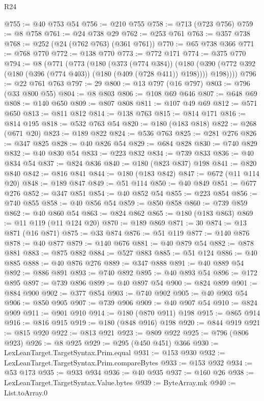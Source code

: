 \begin{lexlean}{R24}
\begin{coremodule}
@755 := @40 @753 @54
@756 := @210 @755
@758 := @713 (@723 @756)
@759 := @8 @758
@761 := @24 @738 @29
@762 := @253 @761
@763 := @357 @738
@768 := @252 (@24 (@762 @763) (@361 @761))
@770 := @65 @738 @366
@771 := @768 @770
@772 := @138 @770
@773 := @772 @171
@774 := @375 @770
@794 := @8
    (@771
      (@773
        (@180
          (@373 (@774 @384))
          (@180 (@390 (@772 @392 (@180 (@396 (@774 @403)) (@180 (@409 (@728 @411)) @198)))) @198))))
@796 := @22 @761 @763
@797 := 29
@800 := @13 @797 (@16 @797)
@803 := @796 (@33 @800 @55)
@804 := @8 @803
@806 := @108 @69 @646
@807 := @648 @69
@808 := @140 @650
@809 := @807 @808
@811 := @107 @49 @69
@812 := @571 @650
@813 := @811 @812
@814 := @138 @763
@815 := @814 @171
@816 := @814 @195
@818 := @532 @763 @54
@820 := @180 (@183 @818)
@822 := @268 (@671 @20)
@823 := @189 @822
@824 := @536 @763
@825 := @281 @276
@826 := @347 @825
@828 := @40 @826 @54
@829 := @684 @828
@830 := @740 @829
@832 := @40 @830 @54
@833 := @223 @832
@834 := @739 @833
@836 := @40 @834 @54
@837 := @824 @836
@840 := @180 (@823 @837) @198
@841 := @820 @840
@842 := @816 @841
@844 := @180 (@183 @842)
@847 := @672 (@11 @114 @20)
@848 := @189 @847
@849 := @51 @114
@850 := @40 @849
@851 := @677 @276
@852 := @347 @851
@854 := @40 @852 @54
@855 := @223 @854
@856 := @740 @855
@858 := @40 @856 @54
@859 := @850 @858
@860 := @739 @859
@862 := @40 @860 @54
@863 := @824 @862
@865 := @180 (@183 @863)
@869 := @11 @119 (@11 @124 @20)
@870 := @189 @869
@871 := 30
@874 := @13 @871 (@16 @871)
@875 := @33 @874
@876 := @51 @119
@877 := @140 @876
@878 := @40 @877
@879 := @140 @676
@881 := @40 @879 @54
@882 := @878 @881
@883 := @875 @882
@884 := @527 @883
@885 := @51 @124
@886 := @40 @885
@888 := @40 @876 @276
@889 := @347 @888
@891 := @40 @889 @54
@892 := @886 @891
@893 := @740 @892
@895 := @40 @893 @54
@896 := @172 @895
@897 := @739 @896
@899 := @40 @897 @54
@900 := @824 @899
@901 := @884 @900
@902 := @377 @854
@903 := @740 @902
@905 := @40 @903 @54
@906 := @850 @905
@907 := @739 @906
@909 := @40 @907 @54
@910 := @824 @909
@911 := @901 @910
@914 := @180 (@870 @911) @198
@915 := @865 @914
@916 := @816 @915
@919 := @180 (@848 @916) @198
@920 := @844 @919
@921 := @815 @920
@922 := @813 @921
@923 := @809 @922
@925 := @796 (@806 @923)
@926 := @8 @925
@929 := @295 (@450 @451) @366
@930 := LexLeanTarget.TargetSyntax.Prim.equal
@931 := @153 @930
@932 := LexLeanTarget.TargetSyntax.Prim.compareBytes
@933 := @153 @932
@934 := @53 @173
@935 := @933 @934
@936 := @40 @935
@937 := @160 @26
@938 := LexLeanTarget.TargetSyntax.Value.bytes
@939 := ByteArray.mk
@940 := List.toArray.{0}

\end{coremodule}
\end{lexlean}
